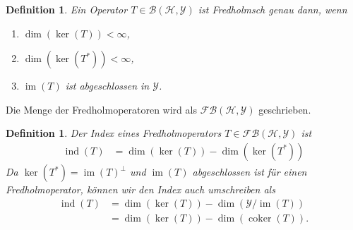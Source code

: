 \documentclass[11pt, hidelinks]{article}
\newcommand{\h}{\mathcal{H}}
\newcommand{\ind}{\operatorname{ind}}
\newcommand{\im}{\operatorname{im}}
\newcommand{\coker}{\operatorname{coker}}
\numberwithin{conj}{section}
\newtheorem{definition}[conj]{Definition}
\begin{document}
\begin{definition}
    Ein Operator $T \in \mathcal{B}(\h,\mathcal{Y})$ ist Fredholmsch genau dann, wenn
    \begin{enumerate}
        \item $\dim(\ker(T)) < \infty$,
        \item $\dim(\ker(T^\ast)) < \infty$,
        \item $\im(T)$ ist abgeschlossen in $\mathcal{Y}$.
    \end{enumerate}
\end{definition}

Die Menge der Fredholmoperatoren wird als $\mathcal{FB}(\h,\mathcal{Y})$ geschrieben.

\begin{definition}
    Der Index eines Fredholmoperators $T \in \mathcal{FB}(\h,\mathcal{Y})$ ist
    \begin{align}
        \ind(T) &= \dim(\ker(T)) - \dim(\ker(T^\ast))
    \end{align}
    Da $\ker(T^\ast) = \im(T)^\perp$ und $\im(T)$ abgeschlossen ist für einen Fredholmoperator, können wir den Index auch umschreiben als
    \begin{align}
        \ind(T) &= \dim(\ker(T)) - \dim(\mathcal{Y}/\im(T)) \nonumber\\
                &= \dim(\ker(T)) - \dim(\coker(T)).
    \end{align}
\end{definition}
\end{document}
